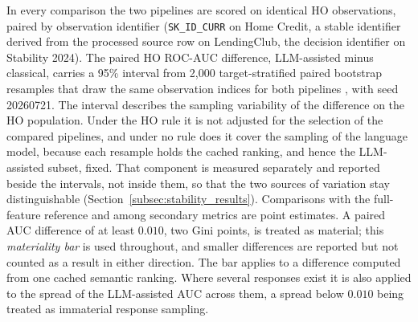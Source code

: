 \documentclass[final,5p,twocolumn]{elsarticle}
\begin{document}
In every comparison the two pipelines are scored on identical HO observations, paired by observation identifier (\texttt{SK\_\allowbreak ID\_\allowbreak CURR} on Home Credit, a stable identifier derived from the processed source row on LendingClub, the decision identifier on Stability 2024). The paired HO ROC-AUC difference, LLM-assisted minus classical, carries a 95\% interval from 2,000 target-stratified paired bootstrap resamples that draw the same observation indices for both pipelines \cite{efron1993}, with seed 20260721. The interval describes the sampling variability of the difference on the HO population. Under the HO rule it is not adjusted for the selection of the compared pipelines, and under no rule does it cover the sampling of the language model, because each resample holds the cached ranking, and hence the LLM-assisted subset, fixed. That component is measured separately and reported beside the intervals, not inside them, so that the two sources of variation stay distinguishable (Section~\ref{subsec:stability_results}). Comparisons with the full-feature reference and among secondary metrics are point estimates. A paired AUC difference of at least $0.010$, two Gini points, is treated as material; this \emph{materiality bar} is used throughout, and smaller differences are reported but not counted as a result in either direction. The bar applies to a difference computed from one cached semantic ranking. Where several responses exist it is also applied to the spread of the LLM-assisted AUC across them, a spread below $0.010$ being treated as immaterial response sampling.
\end{document}
